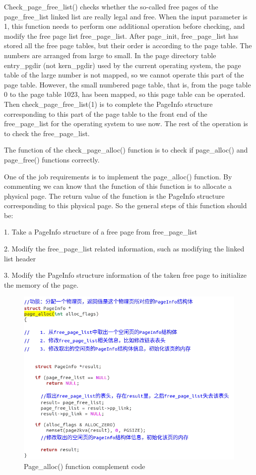 Check\_page\_free\_list() checks whether the so-called free pages of the page\_free\_list linked list are really legal and free. When the input parameter is 1, this function needs to perform one additional operation before checking, and modify the free page list free\_page\_list. After page\_init, free\_page\_list has stored all the free page tables, but their order is according to the page table. The numbers are arranged from large to small. In the page directory table entry\_pgdir (not kern\_pgdir) used by the current operating system, the page table of the large number is not mapped, so we cannot operate this part of the page table. However, the small numbered page table, that is, from the page table 0 to the page table 1023, has been mapped, so this page table can be operated. Then check\_page\_free\_list(1) is to complete the PageInfo structure corresponding to this part of the page table to the front end of the free\_page\_list for the operating system to use now. The rest of the operation is to check the free\_page\_list.

The function of the check\_page\_alloc() function is to check if page\_alloc() and page\_free() functions correctly.

One of the job requirements is to implement the page\_alloc() function. By commenting we can know that the function of this function is to allocate a physical page. The return value of the function is the PageInfo structure corresponding to this physical page. So the general steps of this function should be:

1. Take a PageInfo structure of a free page from free\_page\_list

2. Modify the free\_page\_list related information, such as modifying the linked list header

3. Modify the PageInfo structure information of the taken free page to initialize the memory of the page.

\begin{figure}[H]
\centering
\includegraphics[width=0.8\linewidth]{figure/page_alloc_changed}
\caption{Page\_alloc() function complement code}
\end{figure}

